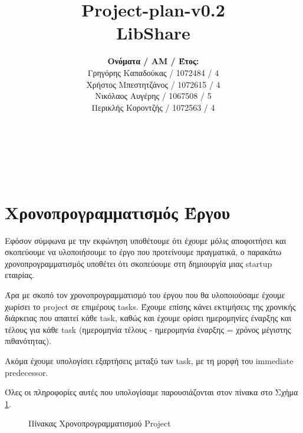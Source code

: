 \documentclass[12pt,a4paper]{article}
\title{Project-plan-v0.2 \\ LibShare}
\author{\textbf{Ονόματα / ΑΜ / Έτος:} \\ Γρηγόρης Καπαδούκας / 1072484 / 4\textdegree \\ Χρήστος Μπεστητζάνος / 1072615 / 4\textdegree \\ Νικόλαος Αυγέρης / 1067508 / 5\textdegree \\ Περικλής Κοροντζής / 1072563 / 4\textdegree}
\begin{document}
\makeatletter
\begin{center}
	\LARGE{\@title} \\
	\pagebreak
    \begin{LARGE}\@author\end{LARGE} \\
\end{center}
\pagebreak

\section{Χρονοπρογραμματισμός Έργου}
Εφόσον σύμφωνα με την εκφώνηση υποθέτουμε ότι έχουμε μόλις αποφοιτήσει και σκοπεύουμε να υλοποιήσουμε το έργο που προτείνουμε πραγματικά, ο παρακάτω χρονοπρογραμματισμός υποθέτει ότι σκοπεύουμε στη δημιουργία μιας startup εταιρίας.

Άρα με σκοπό τον χρονοπρογραμματισμό του έργου που θα υλοποιούσαμε έχουμε χωρίσει το project σε επιμέρους tasks. Έχουμε επίσης κάνει εκτιμήσεις της χρονικής διάρκειας που απαιτεί κάθε task, καθώς και έχουμε ορίσει ημερομηνίες έναρξης και τέλους για κάθε task (ημερομηνία τέλους - ημερομηνία έναρξης = χρόνος μέγιστης πιθανότητας).

Ακόμα έχουμε υπολογίσει εξαρτήσεις μεταξύ των task, με τη μορφή του immediate predecessor.

Όλες οι πληροφορίες αυτές που υπολογίσαμε παρουσιάζονται στον πίνακα στο Σχήμα \ref{Πίνακας Χρονοπρογραμματισμού Project}.

\begin{figure}[H]
	\caption{Πίνακας Χρονοπρογραμματισμού Project}
	\label{Πίνακας Χρονοπρογραμματισμού Project}
\end{figure}
\end{document}
